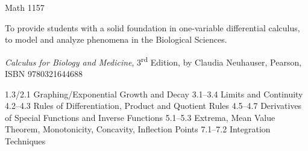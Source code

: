 \documentclass{osucourse}
\begin{document}
\CatalogDescription
\PrerequisitesAndExclusions

\begin{FollowupCourses}
Math 1157
\end{FollowupCourses}

\begin{Purpose}
To provide students with a solid foundation in one-variable differential calculus, to model and analyze phenomena in the Biological Sciences.
\end{Purpose}

\begin{Text}
\emph{Calculus for Biology and Medicine}, 3\textsuperscript{rd} Edition, by Claudia Neuhauser, Pearson, ISBN 9780321644688
\end{Text}

\begin{TopicsOutline}
1.3/2.1     Graphing/Exponential Growth and Decay
3.1--3.4     Limits and Continuity
4.2--4.3     Rules of Differentiation, Product and Quotient Rules
4.5--4.7     Derivatives of Special Functions and Inverse Functions
5.1--5.3     Extrema, Mean Value Theorem, Monotonicity, Concavity, Inflection Points
7.1--7.2     Integration Techniques
\end{TopicsOutline}
\end{document}
